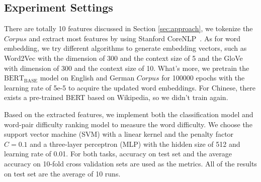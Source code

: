 \subsection{Experiment Settings}
\label{sec:exper}
There are totally 10 features discussed in Section \ref{sec:approach},
we tokenize the $Corpus$ and extract most features by using Stanford CoreNLP~\cite{manning2014stanford}.
As for word embedding, we try different algorithms to generate embedding vectors,
such as Word2Vec with the dimension of 300 and the context size of 5 and the GloVe with dimension of 300 and the context size of 10.
What's more, we pretrain the $\text{BERT}_\text{BASE}$ model on English and German $Corpus$ for 100000 epochs with the learning rate of 5e-5 to acquire the updated word embeddings.
For Chinese, there exists a pre-trained BERT based on Wikipedia, so we didn't train again.

Based on the extracted features, we implement both the classification model and word-pair difficulty ranking model to measure the word difficulty.
We choose the support vector machine (SVM) with a linear kernel and the penalty factor $C=0.1$ and a three-layer perceptron (MLP) with the hidden size of 512 and learning rate of 0.01.
For both tasks, accuracy on test set and the average accuracy on 10-fold cross validation sets are used as the metrics. All of the results on test set are the average of 10 runs.


